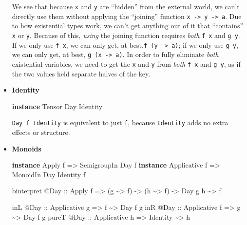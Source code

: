 \documentclass[]{article}
\newenvironment{Shaded}{}{}
\newcommand{\DataTypeTok}[1]{\textcolor[rgb]{0.56,0.13,0.00}{#1}}
\newcommand{\KeywordTok}[1]{\textcolor[rgb]{0.00,0.44,0.13}{\textbf{#1}}}
\newcommand{\NormalTok}[1]{#1}
\newcommand{\OperatorTok}[1]{\textcolor[rgb]{0.40,0.40,0.40}{#1}}
\newcommand{\OtherTok}[1]{\textcolor[rgb]{0.00,0.44,0.13}{#1}}
\begin{document}
\begin{itemize}
  We see that because \texttt{x} and \texttt{y} are ``hidden'' from the external
  world, we can't directly use them without applying the ``joining'' function
  \texttt{x\ -\textgreater{}\ y\ -\textgreater{}\ a}. Due to how existential
  types work, we can't get anything out of it that ``contains'' \texttt{x} or
  \texttt{y}. Because of this, \emph{using} the joining function requires
  \emph{both} \texttt{f\ x} and \texttt{g\ y}. If we only use \texttt{f\ x}, we
  can only get, at best,\texttt{f\ (y\ -\textgreater{}\ a)}; if we only use
  \texttt{g\ y}, we can only get, at best, \texttt{g\ (x\ -\textgreater{}\ a)}.
  In order to fully eliminate \emph{both} existential variables, we need to get
  the \texttt{x} and \texttt{y} from \emph{both} \texttt{f\ x} and
  \texttt{g\ y}, as if the two values held separate halves of the key.
\item
  \textbf{Identity}

\begin{Shaded}
\begin{Highlighting}[]
\KeywordTok{instance} \DataTypeTok{Tensor} \DataTypeTok{Day} \DataTypeTok{Identity}
\end{Highlighting}
\end{Shaded}

  \texttt{Day\ f\ Identity} is equivalent to just \texttt{f}, because
  \texttt{Identity} adds no extra effects or structure.
\item
  \textbf{Monoids}

\begin{Shaded}
\begin{Highlighting}[]
\KeywordTok{instance} \DataTypeTok{Apply}\NormalTok{       f }\OtherTok{=>} \DataTypeTok{SemigroupIn} \DataTypeTok{Day}\NormalTok{ f}
\KeywordTok{instance} \DataTypeTok{Applicative}\NormalTok{ f }\OtherTok{=>} \DataTypeTok{MonoidIn}    \DataTypeTok{Day} \DataTypeTok{Identity}\NormalTok{ f}

\NormalTok{binterpret }\OperatorTok{@}\DataTypeTok{Day}
\OtherTok{    ::} \DataTypeTok{Apply}\NormalTok{ f}
    \OtherTok{=>}\NormalTok{ (g }\OperatorTok{\textasciitilde{}>}\NormalTok{ f)}
    \OtherTok{{-}>}\NormalTok{ (h }\OperatorTok{\textasciitilde{}>}\NormalTok{ f)}
    \OtherTok{{-}>} \DataTypeTok{Day}\NormalTok{ g h }\OperatorTok{\textasciitilde{}>}\NormalTok{ f}

\NormalTok{inL   }\OperatorTok{@}\DataTypeTok{Day}\OtherTok{ ::} \DataTypeTok{Applicative}\NormalTok{ g }\OtherTok{=>}\NormalTok{ f        }\OperatorTok{\textasciitilde{}>} \DataTypeTok{Day}\NormalTok{ f g}
\NormalTok{inR   }\OperatorTok{@}\DataTypeTok{Day}\OtherTok{ ::} \DataTypeTok{Applicative}\NormalTok{ f }\OtherTok{=>}\NormalTok{ g        }\OperatorTok{\textasciitilde{}>} \DataTypeTok{Day}\NormalTok{ f g}
\NormalTok{pureT }\OperatorTok{@}\DataTypeTok{Day}\OtherTok{ ::} \DataTypeTok{Applicative}\NormalTok{ h }\OtherTok{=>} \DataTypeTok{Identity} \OperatorTok{\textasciitilde{}>}\NormalTok{ h}
\end{Highlighting}
\end{Shaded}


\end{itemize}
\end{document}
